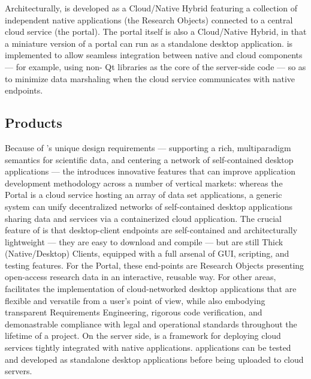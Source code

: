 \documentclass[11pt,letterpaper]{article}
\begin{document}
\p{}\vspace{-.5em}
Architecturally, {\MOSAIC} is developed as a 
Cloud/Native Hybrid featuring a collection of 
independent native applications (the {\RAK} 
Research Objects) connected to a central 
cloud service (the {\MOSAIC} portal).  The portal 
itself is also a Cloud/Native Hybrid, in that a 
miniature version of a {\MOSAIC} portal can run 
as a standalone desktop application.  {\lfMOSAIC} 
is implemented to allow seamless integration between 
native and cloud components --- for example, 
using non-{\GUI} Qt libraries as the core of the 
server-side code --- so as to minimize data 
marshaling when the cloud service 
communicates with native endpoints.

\subsection{{\lMOSAIC} Products}
Because of {\MOSAIC}'s unique design 
requirements --- supporting a 
rich, multiparadigm semantics for scientific data,  
and centering a network of self-contained 
desktop applications --- the {\MOSAIC} {\SDK} 
introduces innovative features that can improve 
application development methodology across 
a number of vertical markets:   
whereas the {\MOSAIC} Portal is a cloud service 
hosting an array of data set applications, a 
generic {\MOSAIC} system can unify decentralized 
networks of self-contained desktop applications sharing 
data and services via a containerized cloud application.  
\p{}
The crucial feature of {\MOSAIC} is that desktop-client 
endpoints are self-contained and architecturally 
lightweight --- they are easy to download and 
compile --- but are still Thick (Native/Desktop) Clients, equipped 
with a full arsenal of GUI, scripting, and testing features.  
For the {\MOSAIC} Portal, these end-points are Research Objects 
presenting open-access research data in an interactive, reusable 
way.  For other areas, {\MOSAIC} facilitates the 
implementation of cloud-networked desktop 
applications 
that are flexible and versatile 
from a user's point of view, 
while also embodying transparent Requirements 
Engineering, rigorous code verification, 
and demonastrable compliance with 
legal and operational standards throughout the 
lifetime of a project.
\p{}
\lead{{\NDPCloud}} On the 
server side, {\NDPCloud} is a framework for deploying 
cloud services tightly integrated with native applications.  
{\NDPCloud} applications can be tested and 
developed as standalone desktop applications before 
being uploaded to cloud servers.  
\end{document}
